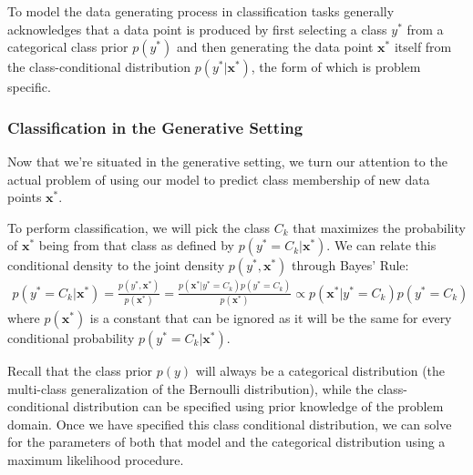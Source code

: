 To model the data generating process in classification tasks generally acknowledges that a data point is produced by first selecting a class $y^{*}$ from a categorical class prior $p(y^{*})$ and then generating the data point $\textbf{x}^{*}$ itself from the class-conditional distribution $p(y^{*}|\textbf{x}^{*})$, the form of which is problem specific.


\subsubsection{Classification in the Generative Setting}
Now that we're situated in the generative setting, we turn our attention to the actual problem of using our model to predict class membership of new data points $\textbf{x}^{*}$.

To perform classification, we will pick the class $C_{k}$ that maximizes the probability of $\textbf{x}^{*}$ being from that class as defined by $p(y^{*} = C_{k} | \textbf{x}^{*})$. We can relate this conditional density to the joint density $p(y^{*}, \textbf{x}^{*})$ through Bayes' Rule:
\begin{align*}
	p(y^{*} = C_{k} | \textbf{x}^{*}) = \frac{p(y^{*}, \textbf{x}^{*})}{p(\textbf{x}^{*})} = \frac{p(\textbf{x}^{*} | y^{*} = C_{k})p(y^{*} = C_{k})}{p(\textbf{x}^{*})} \propto p(\textbf{x}^{*} | y^{*} = C_{k})p(y^{*} = C_{k})
\end{align*}
where $p(\textbf{x}^{*})$ is a constant that can be ignored as it will be the same for every conditional probability $p(y^{*} = C_{k}|\textbf{x}^{*})$.

Recall that the class prior $p(y)$ will always be a categorical distribution (the multi-class generalization of the Bernoulli distribution), while the class-conditional distribution can be specified using prior knowledge of the problem domain. Once we have specified this class conditional distribution, we can solve for the parameters of both that model and the categorical distribution using a maximum likelihood procedure.

